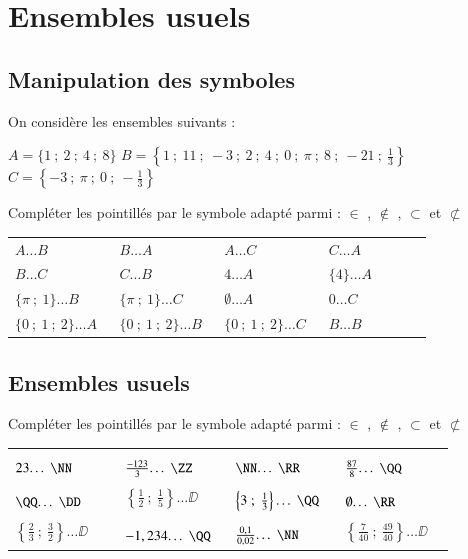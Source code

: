 \documentclass[oneside,12pt]{article}          %
\begin{document}
\section{Ensembles usuels}

\subsection{Manipulation des symboles}
On considère les ensembles suivants :

$A=\{1~;~2~;~4~;~8\}$ \qquad $B=\left\{1~;~11~;~-3~;~2~;~4~;~0~;~\pi~;~8~;~-21~;~\frac{1}{3}\right\}$ \qquad $C=\left\{-3~;~\pi~;~0~;~-\frac{1}{3}\right\}$

Compléter les pointillés par le symbole adapté parmi : $\in$ , $\notin$ , $\subset$ et $\not\subset$

\renewcommand{\arraystretch}{1.5}
\begin{tabular}{P{0.23\linewidth} P{0.23\linewidth} P{0.23\linewidth} P{0.23\linewidth}}
    $A\ldots B$ & $B\ldots A$ & $A\ldots C$ & $C \ldots A$ \\
    $B \ldots C$ & $C \ldots B$ & $4 \ldots A$ & $\{4\} \ldots A$ \\
    $\{\pi~;~1\} \ldots B$ & $\{\pi~;~1\} \ldots C$ & $\emptyset \ldots A$ & $0 \ldots C$ \\
    $\{0~;~1~;~2\} \ldots A$ & $\{0~;~1~;~2\} \ldots B$ & $\{0~;~1~;~2\} \ldots C$ & $B \ldots B$
\end{tabular}



\subsection{Ensembles usuels}
Compléter les pointillés par le symbole adapté parmi : $\in$ , $\notin$ , $\subset$ et $\not\subset$

\renewcommand{\arraystretch}{1.5}
\begin{tabular}{P{0.23\linewidth} P{0.23\linewidth} P{0.23\linewidth} P{0.23\linewidth}}
    $23 \ldots \NN$ & $\frac{-123}{3} \ldots \ZZ$ & $\NN \ldots \RR$ & $\frac{87}{8} \ldots \QQ$ \\
    $\QQ \ldots \DD$ & $\left\{\frac{1}{2}~;~\frac{1}{5}\right\} \ldots \DD$ & $\left\{3~;~\frac{1}{3}\right\} \ldots \QQ$ & $\emptyset \ldots \RR$ \\
    $\left\{\frac{2}{3}~;~\frac{3}{2}\right\} \ldots \DD$ & $-1,234 \ldots \QQ$ & $\frac{0,1}{0,02} \ldots \NN$ & $\left\{\frac{7}{40} ~;~\frac{49}{40}\right\} \ldots \DD$
\end{tabular}
\end{document}
